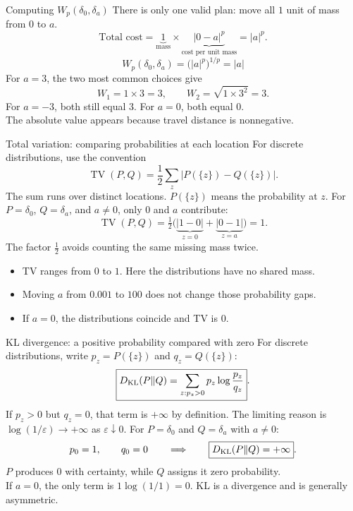\documentclass[aspectratio=169,11pt]{beamer}
\begin{document}
\begin{frame}{Computing $W_p(\delta_0,\delta_a)$}
There is only one valid plan: move all $1$ unit of mass from $0$ to $a$.
\vspace{3mm}
\[
\text{Total cost}=\underbrace{1}_{\text{mass}}\times
\underbrace{|0-a|^p}_{\text{cost per unit mass}}=|a|^p.
\]
\[
\boxed{W_p(\delta_0,\delta_a)=\bigl(|a|^p\bigr)^{1/p}=|a|}
\]
\vspace{3mm}
For $a=3$, the two most common choices give
\[W_1=1\times3=3,\qquad W_2=\sqrt{1\times3^2}=3.\]
For $a=-3$, both still equal $3$. For $a=0$, both equal $0$.\\[3mm]
The absolute value appears because travel distance is nonnegative.
\end{frame}

\begin{frame}{Total variation: comparing probabilities at each location}
For discrete distributions, use the convention
\[
\boxed{\operatorname{TV}(P,Q)=\frac12\sum_z
\left|P(\{z\})-Q(\{z\})\right|}.
\]
The sum runs over distinct locations. $P(\{z\})$ means the probability at $z$.
For $P=\delta_0$, $Q=\delta_a$, and $a\ne0$, only $0$ and $a$ contribute:
\[
\operatorname{TV}(P,Q)=\tfrac12\bigl(\underbrace{|1-0|}_{z=0}
+\underbrace{|0-1|}_{z=a}\bigr)=\boxed{1}.
\]
The factor $\tfrac12$ avoids counting the same missing mass twice.
\vspace{3mm}
\begin{itemize}\setlength\itemsep{2mm}
\item TV ranges from $0$ to $1$. Here the distributions have no shared mass.
\item Moving $a$ from $0.001$ to $100$ does not change those probability gaps.
\item If $a=0$, the distributions coincide and TV is $0$.
\end{itemize}
\end{frame}

\begin{frame}{KL divergence: a positive probability compared with zero}
For discrete distributions, write $p_z=P(\{z\})$ and $q_z=Q(\{z\})$:
\[
\boxed{D_{\rm KL}(P\Vert Q)=\sum_{z:p_z>0}p_z\log\frac{p_z}{q_z}}.
\]
If $p_z>0$ but $q_z=0$, that term is $+\infty$ by definition. The limiting
reason is $\log(1/\varepsilon)\longrightarrow+\infty$ as $\varepsilon\downarrow0$.
\vspace{3mm}
For $P=\delta_0$ and $Q=\delta_a$ with $a\ne0$:
\[p_0=1,\qquad q_0=0\qquad\Longrightarrow\qquad
\boxed{D_{\rm KL}(P\Vert Q)=+\infty}.\]
$P$ produces $0$ with certainty, while $Q$ assigns it zero probability.\\[3mm]
If $a=0$, the only term is $1\log(1/1)=0$.
KL is a divergence and is generally asymmetric.
\end{frame}
\end{document}
